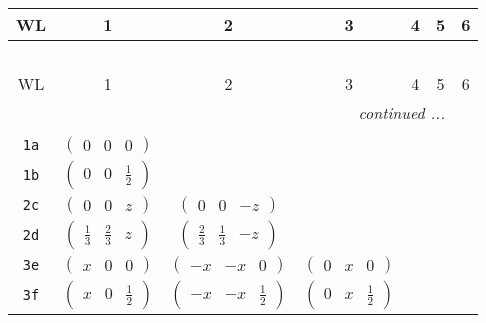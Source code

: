 \documentclass[fleqn,9pt,landscape]{jsarticle}
\begin{document}
\begin{center}
\renewcommand{\arraystretch}{1.2}
\begin{longtable}{ccccccc}
 \hline \hline
WL & 1 & 2 & 3 & 4 & 5 & 6 \\ \hline \endfirsthead

\multicolumn{6}{l}{\tablename\ \thetable{}} \\
 \hline \hline
WL & 1 & 2 & 3 & 4 & 5 & 6 \\ \hline \endhead

 \hline \hline
\multicolumn{6}{r}{\footnotesize\it continued ...} \\ \endfoot

 \hline \hline
\multicolumn{6}{r}{} \\ \endlastfoot

{\tt 1a} & $ \begin{pmatrix} 0 & 0 & 0 \end{pmatrix} $ & $  $ & $  $ & $  $ & $  $ & $  $ \\ \hline
{\tt 1b} & $ \begin{pmatrix} 0 & 0 & \frac{1}{2} \end{pmatrix} $ & $  $ & $  $ & $  $ & $  $ & $  $ \\ \hline
{\tt 2c} & $ \begin{pmatrix} 0 & 0 & z \end{pmatrix} $ & $ \begin{pmatrix} 0 & 0 & - z \end{pmatrix} $ & $  $ & $  $ & $  $ & $  $ \\ \hline
{\tt 2d} & $ \begin{pmatrix} \frac{1}{3} & \frac{2}{3} & z \end{pmatrix} $ & $ \begin{pmatrix} \frac{2}{3} & \frac{1}{3} & - z \end{pmatrix} $ & $  $ & $  $ & $  $ & $  $ \\ \hline
{\tt 3e} & $ \begin{pmatrix} x & 0 & 0 \end{pmatrix} $ & $ \begin{pmatrix} - x & - x & 0 \end{pmatrix} $ & $ \begin{pmatrix} 0 & x & 0 \end{pmatrix} $ & $  $ & $  $ & $  $ \\ \hline
{\tt 3f} & $ \begin{pmatrix} x & 0 & \frac{1}{2} \end{pmatrix} $ & $ \begin{pmatrix} - x & - x & \frac{1}{2} \end{pmatrix} $ & $ \begin{pmatrix} 0 & x & \frac{1}{2} \end{pmatrix} $ & $  $ & $  $ & $  $ \\ \hline

\end{longtable}
\end{center}
\end{document}
